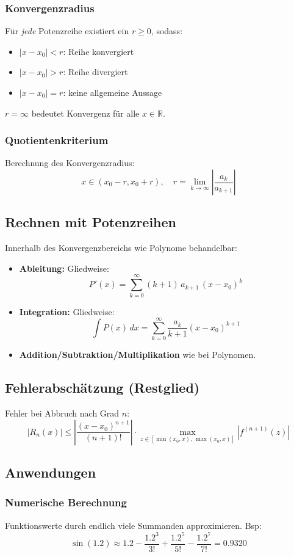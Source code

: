 \subsubsection{Konvergenzradius}
Für \textit{jede} Potenzreihe existiert ein \(r \geq 0\), sodass:
\begin{itemize}
    \item \(|x-x_0| < r\): Reihe konvergiert
    \item \(|x-x_0| > r\): Reihe divergiert
    \item \(|x-x_0| = r\): keine allgemeine Aussage
\end{itemize}
\(r = \infty\) bedeutet Konvergenz für alle \(x \in \mathbb{R}\).

\subsubsection{Quotientenkriterium}
Berechnung des Konvergenzradius:
\[
   x \in (x_0-r, x_0+r), \quad r = \lim_{k\to\infty} \left|\frac{a_k}{a_{k+1}}\right|
\]

\subsection{Rechnen mit Potenzreihen}
Innerhalb des Konvergenzbereichs wie Polynome behandelbar:
\begin{itemize}
    \item \textbf{Ableitung:} Gliedweise:
          \[P'(x) = \sum_{k=0}^{\infty} (k+1)\,a_{k+1}\,(x-x_0)^k\]
    \item \textbf{Integration:} Gliedweise:
          \[\int P(x)\,dx = \sum_{k=0}^{\infty} \frac{a_k}{k+1}(x-x_0)^{k+1}\]
    \item \textbf{Addition/Subtraktion/Multiplikation} wie bei Polynomen.
\end{itemize}

\subsection{Fehlerabschätzung (Restglied)}
Fehler bei Abbruch nach Grad \(n\):
\[
    |R_n(x)| \leq \left|\frac{(x-x_0)^{n+1}}{(n+1)!}\right| \cdot \max_{z \in [\min(x_0,x),\, \max(x_0,x)]} \left|f^{(n+1)}(z)\right|
\]

\subsection{Anwendungen}

\subsubsection{Numerische Berechnung}
Funktionswerte durch endlich viele Summanden approximieren. Bsp:
\[
    \sin(1.2) \approx 1.2 - \frac{1.2^3}{3!} + \frac{1.2^5}{5!} - \frac{1.2^7}{7!} = 0.9320
\]

